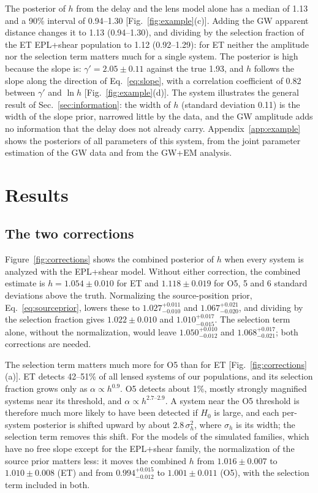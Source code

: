 The posterior of $h$ from the delay and the lens model alone has a median of 1.13 and a 90\% interval of 0.94--1.30 [Fig.~\ref{fig:example}(c)]. Adding the GW apparent distance changes it to 1.13 (0.94--1.30), and dividing by the selection fraction of the ET EPL+shear population to 1.12 (0.92--1.29): for ET neither the amplitude nor the selection term matters much for a single system. The posterior is high because the slope is: $\gamma'=2.05\pm0.11$ against the true 1.93, and $h$ follows the slope along the direction of Eq.~\eqref{eq:slope}, with a correlation coefficient of 0.82 between $\gamma'$ and $\ln h$ [Fig.~\ref{fig:example}(d)]. The system illustrates the general result of Sec.~\ref{sec:information}: the width of $h$ (standard deviation 0.11) is the width of the slope prior, narrowed little by the data, and the GW amplitude adds no information that the delay does not already carry. Appendix~\ref{app:example} shows the posteriors of all parameters of this system, from the joint parameter estimation of the GW data and from the GW+EM analysis.

\section{Results}
\label{sec:results}
\subsection{The two corrections}
\label{sec:corrections}
Figure~\ref{fig:corrections} shows the combined posterior of $h$ when every system is analyzed with the EPL+shear model. Without either correction, the combined estimate is $h=1.054\pm0.010$ for ET and $1.118\pm0.019$ for O5, 5 and 6 standard deviations above the truth. Normalizing the source-position prior, Eq.~\eqref{eq:sourceprior}, lowers these to $1.027^{+0.011}_{-0.010}$ and $1.067^{+0.021}_{-0.020}$, and dividing by the selection fraction gives $1.022\pm0.010$ and $1.010^{+0.017}_{-0.015}$. The selection term alone, without the normalization, would leave $1.050^{+0.010}_{-0.012}$ and $1.068^{+0.017}_{-0.021}$; both corrections are needed.

The selection term matters much more for O5 than for ET [Fig.~\ref{fig:corrections}(a)]. ET detects 42--51\% of all lensed systems of our populations, and its selection fraction grows only as $\alpha\propto h^{0.9}$. O5 detects about 1\%, mostly strongly magnified systems near its threshold, and $\alpha\propto h^{2.7\text{--}2.9}$. A system near the O5 threshold is therefore much more likely to have been detected if $H_0$ is large, and each per-system posterior is shifted upward by about $2.8\,\sigma_h^2$, where $\sigma_h$ is its width; the selection term removes this shift. For the models of the simulated families, which have no free slope except for the EPL+shear family, the normalization of the source prior matters less: it moves the combined $h$ from $1.016\pm0.007$ to $1.010\pm0.008$ (ET) and from $0.994^{+0.015}_{-0.012}$ to $1.001\pm0.011$ (O5), with the selection term included in both.

